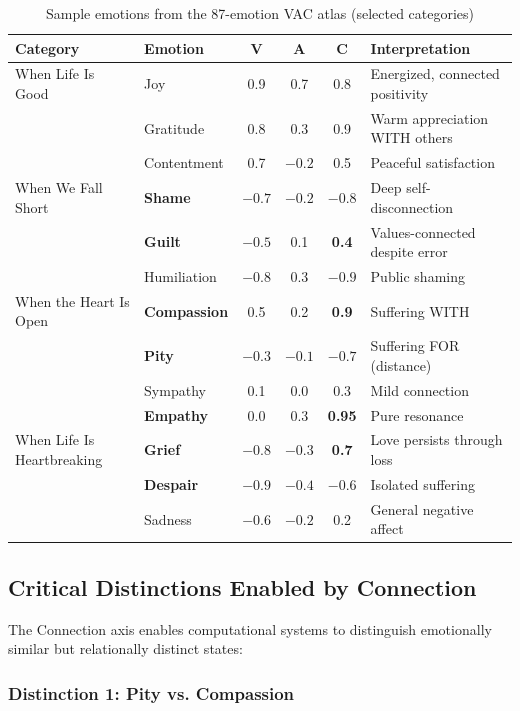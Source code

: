 \documentclass[10pt,twocolumn]{article}
\begin{document}
\begin{table}[t]
\centering
\caption{Sample emotions from the 87-emotion VAC atlas (selected categories)}
\label{tab:atlas-sample}
\small
\begin{tabular}{llcccp{4cm}}
\toprule
\textbf{Category} & \textbf{Emotion} & \textbf{V} & \textbf{A} & \textbf{C} & \textbf{Interpretation} \\
\midrule
When Life Is Good & Joy & 0.9 & 0.7 & 0.8 & Energized, connected positivity \\
& Gratitude & 0.8 & 0.3 & 0.9 & Warm appreciation WITH others \\
& Contentment & 0.7 & $-0.2$ & 0.5 & Peaceful satisfaction \\
\midrule
When We Fall Short & \textbf{Shame} & $-0.7$ & $-0.2$ & \textbf{$-0.8$} & Deep self-disconnection \\
& \textbf{Guilt} & $-0.5$ & 0.1 & \textbf{0.4} & Values-connected despite error \\
& Humiliation & $-0.8$ & 0.3 & $-0.9$ & Public shaming \\
\midrule
When the Heart Is Open & \textbf{Compassion} & 0.5 & 0.2 & \textbf{0.9} & Suffering WITH \\
& \textbf{Pity} & $-0.3$ & $-0.1$ & \textbf{$-0.7$} & Suffering FOR (distance) \\
& Sympathy & 0.1 & 0.0 & 0.3 & Mild connection \\
& \textbf{Empathy} & 0.0 & 0.3 & \textbf{0.95} & Pure resonance \\
\midrule
When Life Is Heartbreaking & \textbf{Grief} & $-0.8$ & $-0.3$ & \textbf{0.7} & Love persists through loss \\
& \textbf{Despair} & $-0.9$ & $-0.4$ & \textbf{$-0.6$} & Isolated suffering \\
& Sadness & $-0.6$ & $-0.2$ & 0.2 & General negative affect \\
\bottomrule
\end{tabular}
\end{table}

\subsection{Critical Distinctions Enabled by Connection}

The Connection axis enables computational systems to distinguish emotionally similar but relationally distinct states:

\subsubsection{Distinction 1: Pity vs. Compassion}
\end{document}
